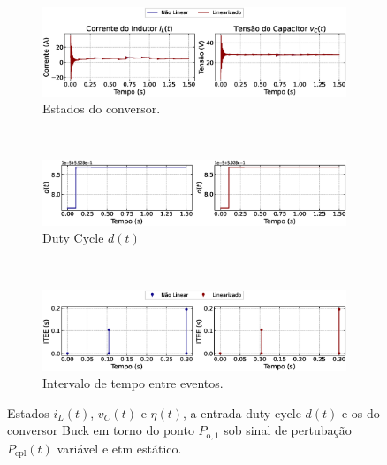 \begin{figure}[H]
  \centering
  \captionsetup{justification=centering}
  \begin{subfigure}{1.\textwidth}
    \centering
    \includegraphics[width=1.\textwidth]{figuras/dynamic-etm/buck/sim2/op1/result.eps}
    \caption{Estados do conversor.}
    \label{fig:buck_converter_variable_pcpl_dynamic_etm_op1_a}
  \end{subfigure}
  \\[6pt]
  \begin{subfigure}{1.\textwidth}
    \centering
    \includegraphics[width=1.\textwidth]{figuras/dynamic-etm/buck/sim2/op1/duty-cycle.eps}
    \caption{Duty Cycle $d(t)$}
    \label{fig:buck_converter_variable_pcpl_dynamic_etm_op1_b}
  \end{subfigure}
  \\[6pt]
  \begin{subfigure}{1.\textwidth}
    \centering
    \includegraphics[width=1.\textwidth]{figuras/dynamic-etm/buck/sim2/op1/inter-event-times.eps}
    \caption{Intervalo de tempo entre eventos.}
    \label{fig:buck_converter_variable_pcpl_dynamic_etm_op1_c}
  \end{subfigure}
  \caption{Estados $i_L(t)$, $v_C(t)$ e $\eta(t)$, a entrada duty cycle $d(t)$ e os  do conversor Buck em torno do ponto $P_{\mathrm{o}, 1}$ sob sinal de pertubação $P_{\mathrm{cpl}}(t)$ variável e \acrshort{etm} estático.}
  \label{fig:buck_converter_variable_pcpl_dynamic_etm_op1}
\end{figure}

